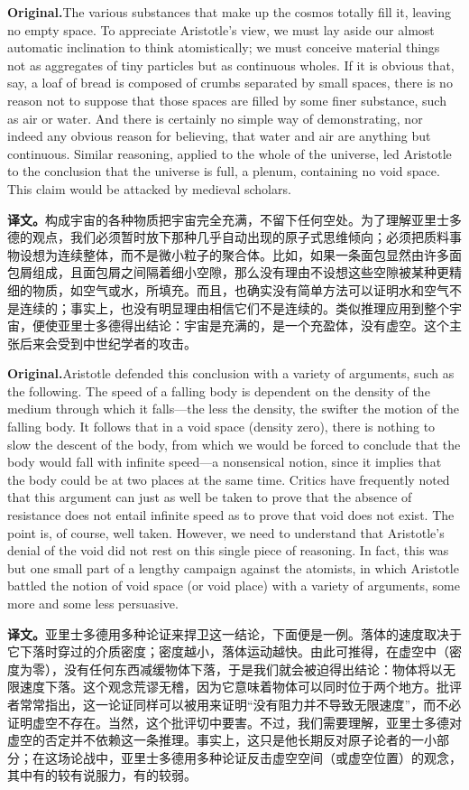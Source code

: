 \documentclass[UTF8]{ctexart}
\newcommand{\orig}{\par\noindent\textbf{Original.}\quad}
\newcommand{\zh}{\par\noindent\textbf{译文。}\quad}
\begin{document}
\orig The various substances that make up the cosmos totally fill it, leaving no empty space. To appreciate Aristotle's view, we must lay aside our almost automatic inclination to think atomistically; we must conceive material things not as aggregates of tiny particles but as continuous wholes. If it is obvious that, say, a loaf of bread is composed of crumbs separated by small spaces, there is no reason not to suppose that those spaces are filled by some finer substance, such as air or water. And there is certainly no simple way of demonstrating, nor indeed any obvious reason for believing, that water and air are anything but continuous. Similar reasoning, applied to the whole of the universe, led Aristotle to the conclusion that the universe is full, a plenum, containing no void space. This claim would be attacked by medieval scholars.

\zh 构成宇宙的各种物质把宇宙完全充满，不留下任何空处。为了理解亚里士多德的观点，我们必须暂时放下那种几乎自动出现的原子式思维倾向；必须把质料事物设想为连续整体，而不是微小粒子的聚合体。比如，如果一条面包显然由许多面包屑组成，且面包屑之间隔着细小空隙，那么没有理由不设想这些空隙被某种更精细的物质，如空气或水，所填充。而且，也确实没有简单方法可以证明水和空气不是连续的；事实上，也没有明显理由相信它们不是连续的。类似推理应用到整个宇宙，便使亚里士多德得出结论：宇宙是充满的，是一个充盈体，没有虚空。这个主张后来会受到中世纪学者的攻击。

\orig Aristotle defended this conclusion with a variety of arguments, such as the following. The speed of a falling body is dependent on the density of the medium through which it falls---the less the density, the swifter the motion of the falling body. It follows that in a void space (density zero), there is nothing to slow the descent of the body, from which we would be forced to conclude that the body would fall with infinite speed---a nonsensical notion, since it implies that the body could be at two places at the same time. Critics have frequently noted that this argument can just as well be taken to prove that the absence of resistance does not entail infinite speed as to prove that void does not exist. The point is, of course, well taken. However, we need to understand that Aristotle's denial of the void did not rest on this single piece of reasoning. In fact, this was but one small part of a lengthy campaign against the atomists, in which Aristotle battled the notion of void space (or void place) with a variety of arguments, some more and some less persuasive.

\zh 亚里士多德用多种论证来捍卫这一结论，下面便是一例。落体的速度取决于它下落时穿过的介质密度；密度越小，落体运动越快。由此可推得，在虚空中（密度为零），没有任何东西减缓物体下落，于是我们就会被迫得出结论：物体将以无限速度下落。这个观念荒谬无稽，因为它意味着物体可以同时位于两个地方。批评者常常指出，这一论证同样可以被用来证明“没有阻力并不导致无限速度”，而不必证明虚空不存在。当然，这个批评切中要害。不过，我们需要理解，亚里士多德对虚空的否定并不依赖这一条推理。事实上，这只是他长期反对原子论者的一小部分；在这场论战中，亚里士多德用多种论证反击虚空空间（或虚空位置）的观念，其中有的较有说服力，有的较弱。
\end{document}
